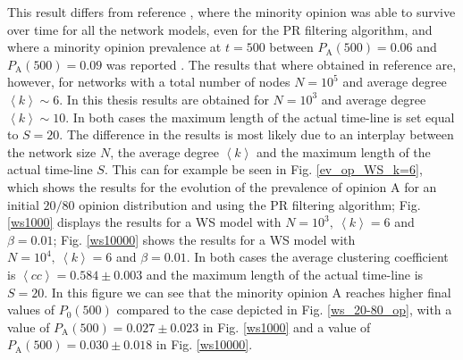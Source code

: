 \documentclass[11 pt , letterpaper , twoside , openright]{book}
\begin{document}
This result differs from reference \cite{Perra2019}, where the minority opinion was able to survive over time for all the network models, even for the PR filtering algorithm, and where a minority opinion prevalence at $t=500$ between $P_\text{A}(500) = 0.06$ and $P_\text{A}(500) = 0.09$ was reported \cite{Perra2019}. The results that where obtained in reference \cite{Perra2019} are, however, for networks with a total number of nodes $N = 10^5$ and average degree $\left<k\right> \sim 6$. In this thesis results are obtained for $N=10^3$ and average degree $\left<k\right> \sim 10$. In both cases the maximum length of the actual time-line is set equal to $S=20$. The difference in the results is most likely due to an interplay between the network size $N$, the average degree $\left<k\right>$ and the maximum length of the actual time-line $S$. This can for example be seen in Fig. \ref{ev_op_WS_k=6}, which shows the results for the evolution of the prevalence of opinion A for an initial $20/80$ opinion distribution and using the PR filtering algorithm; Fig. \ref{ws1000} displays the results for a WS model with $N=10^3,\ \left<k\right>=6$ and $\beta=0.01$; Fig. \ref{ws10000} shows the results for a WS model with $N=10^4,\ \left<k\right>=6$ and $\beta=0.01$. In both cases the average clustering coefficient is $\left<cc\right> = 0.584 \pm 0.003$ and the maximum length of the actual time-line is $S=20$. In this figure we can see that the minority opinion A reaches higher final values of $P_0(500)$ compared to the case depicted in Fig. \ref{ws_20-80_op}, with a value of $P_\text{A}(500) = 0.027 \pm 0.023$ in Fig. \ref{ws1000} and a value of $P_\text{A}(500) = 0.030 \pm 0.018$ in Fig. \ref{ws10000}.
\end{document}

